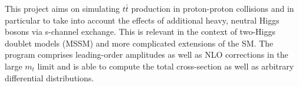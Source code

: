 This project aims on simulating $ t\bar{t} $ production in proton-\/proton collisions and in particular to take into account the effects of additional heavy, neutral Higgs bosons via s-\/channel exchange. This is relevant in the context of two-\/\+Higgs doublet models (M\+S\+S\+M) and more complicated extensions of the S\+M. The program comprises leading-\/order amplitudes as well as N\+L\+O corrections in the large $ m_t $ limit and is able to compute the total cross-\/section as well as arbitrary differential distributions. 